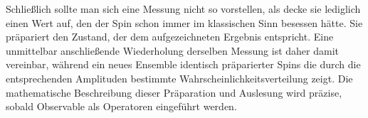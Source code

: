 \begin{classroomqa}
\end{classroomqa}

Schließlich sollte man sich eine Messung nicht so vorstellen, als decke sie lediglich einen Wert auf, den der Spin schon immer im klassischen Sinn besessen hätte. Sie präpariert den Zustand, der dem aufgezeichneten Ergebnis entspricht. Eine unmittelbar anschließende Wiederholung derselben Messung ist daher damit vereinbar, während ein neues Ensemble identisch präparierter Spins die durch die entsprechenden Amplituden bestimmte Wahrscheinlichkeitsverteilung zeigt. Die mathematische Beschreibung dieser Präparation und Auslesung wird präzise, sobald Observable als Operatoren eingeführt werden.